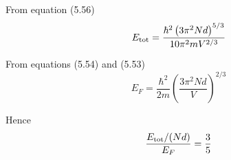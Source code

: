 


\bigskip
From equation (5.56)
\begin{equation*}
E_{\rm tot}=\frac{\hbar^2\left(3\pi^2Nd\right)^{5/3}}{10\pi^2mV^{2/3}}
\end{equation*}

From equations (5.54) and (5.53)
\begin{equation*}
E_F=\frac{\hbar^2}{2m}\left(\frac{3\pi^2Nd}{V}\right)^{2/3}
\end{equation*}

Hence
\begin{equation*}
\frac{E_{\rm tot}/(Nd)}{E_F}=\frac{3}{5}
\end{equation*}


